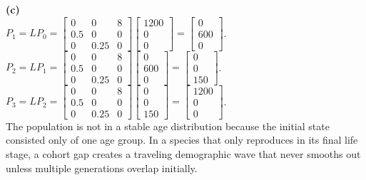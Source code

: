 \begin{solution}
\medskip
\textbf{(c)} \\
$P_1 = L P_0 = \begin{bmatrix} 0 & 0 & 8 \\ 0.5 & 0 & 0 \\ 0 & 0.25 & 0 \end{bmatrix} \begin{bmatrix} 1200 \\ 0 \\ 0 \end{bmatrix} = \begin{bmatrix} 0 \\ 600 \\ 0 \end{bmatrix}$. \\
$P_2 = L P_1 = \begin{bmatrix} 0 & 0 & 8 \\ 0.5 & 0 & 0 \\ 0 & 0.25 & 0 \end{bmatrix} \begin{bmatrix} 0 \\ 600 \\ 0 \end{bmatrix} = \begin{bmatrix} 0 \\ 0 \\ 150 \end{bmatrix}$. \\
$P_3 = L P_2 = \begin{bmatrix} 0 & 0 & 8 \\ 0.5 & 0 & 0 \\ 0 & 0.25 & 0 \end{bmatrix} \begin{bmatrix} 0 \\ 0 \\ 150 \end{bmatrix} = \begin{bmatrix} 1200 \\ 0 \\ 0 \end{bmatrix}$. \\
The population is not in a stable age distribution because the initial state consisted only of one age group. In a species that only reproduces in its final life stage, a cohort gap creates a traveling demographic wave that never smooths out unless multiple generations overlap initially.


\end{solution}
